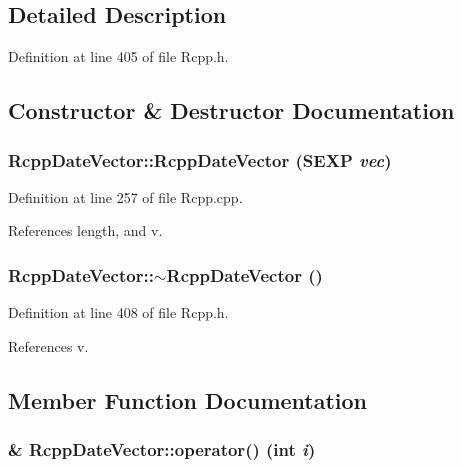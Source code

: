 \subsection{Detailed Description}


Definition at line 405 of file Rcpp.h.

\subsection{Constructor \& Destructor Documentation}
\hypertarget{classRcppDateVector_65de4c0807f5c4b33429c8ebb5224831}{
\subsubsection[{RcppDateVector}]{\setlength{\rightskip}{0pt plus 5cm}RcppDateVector::RcppDateVector (SEXP {\em vec})}}
\label{classRcppDateVector_65de4c0807f5c4b33429c8ebb5224831}




Definition at line 257 of file Rcpp.cpp.

References length, and v.\hypertarget{classRcppDateVector_ad0851f7555a09615ccb17bcb20fc7f1}{
\subsubsection[{$\sim$RcppDateVector}]{\setlength{\rightskip}{0pt plus 5cm}RcppDateVector::$\sim$RcppDateVector ()}}
\label{classRcppDateVector_ad0851f7555a09615ccb17bcb20fc7f1}




Definition at line 408 of file Rcpp.h.

References v.

\subsection{Member Function Documentation}
\hypertarget{classRcppDateVector_7a6d9ceb233ed06f037013bdf4088a23}{
\subsubsection[{operator()}]{\& RcppDateVector::operator() (int {\em i})}}
\label{classRcppDateVector_7a6d9ceb233ed06f037013bdf4088a23}




